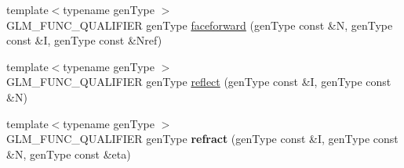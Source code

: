 \begin{DoxyCompactItemize}
\item 
{\footnotesize template$<$typename gen\-Type $>$ }\\G\-L\-M\-\_\-\-F\-U\-N\-C\-\_\-\-Q\-U\-A\-L\-I\-F\-I\-E\-R gen\-Type \hyperlink{group__core__func__geometric_ga4bbb036ef9527ee9f67384233029ed9b}{faceforward} (gen\-Type const \&N, gen\-Type const \&I, gen\-Type const \&Nref)
\item 
{\footnotesize template$<$typename gen\-Type $>$ }\\G\-L\-M\-\_\-\-F\-U\-N\-C\-\_\-\-Q\-U\-A\-L\-I\-F\-I\-E\-R gen\-Type \hyperlink{group__core__func__geometric_gab63646fc36b81cf69d3ce123a72f76f2}{reflect} (gen\-Type const \&I, gen\-Type const \&N)
\item 
\hypertarget{namespaceglm_a9aa448ae8257316d0bd2a7ba6e9f201d}{{\footnotesize template$<$typename gen\-Type $>$ }\\G\-L\-M\-\_\-\-F\-U\-N\-C\-\_\-\-Q\-U\-A\-L\-I\-F\-I\-E\-R gen\-Type {\bfseries refract} (gen\-Type const \&I, gen\-Type const \&N, gen\-Type const \&eta)}\label{namespaceglm_a9aa448ae8257316d0bd2a7ba6e9f201d}


\end{DoxyCompactItemize}
